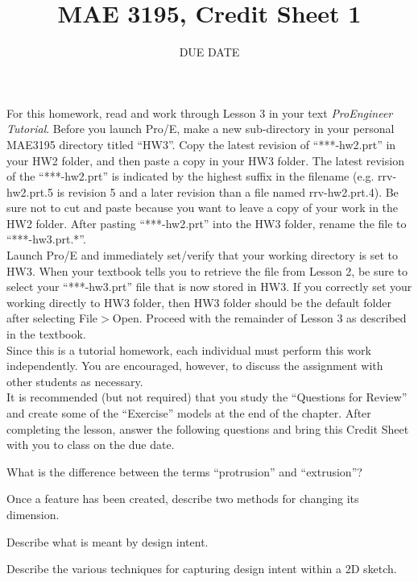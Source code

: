 \documentclass{homework}
\title{MAE 3195, Credit Sheet 1}
\author{DUE DATE}
\begin{document}
For this homework, read and work through Lesson 3 in your text \textit{ProEngineer Tutorial}. Before you launch Pro/E, make a new sub-directory in your personal MAE3195 directory titled ``HW3''. Copy the latest revision of ``***-hw2.prt'' in your HW2 folder, and then paste a copy in your HW3 folder. The latest revision of the ``***-hw2.prt'' is indicated by the highest suffix in the filename (e.g. rrv-hw2.prt.5 is revision 5 and a later revision than a file named rrv-hw2.prt.4). Be sure not to cut and paste because you want to leave a copy of your work in the HW2 folder. After pasting ``***-hw2.prt'' into the HW3 folder, rename the file to ``***-hw3.prt.*''.\\

Launch Pro/E and immediately set/verify that your working directory is set to HW3. When your textbook tells you to retrieve the file from Lesson 2, be sure to select your ``***-hw3.prt'' file that is now stored in HW3. If you correctly set your working directly to HW3 folder, then HW3 folder should be the default folder after selecting File$>$Open. Proceed with the remainder of Lesson 3 as described in the textbook.\\

Since this is a tutorial homework, each individual must perform this work independently. You are encouraged, however, to discuss the assignment with other students as necessary.\\

It is recommended (but not required) that you study the ``Questions for Review'' and create some of the ``Exercise'' models at the end of the chapter. After completing the lesson, answer the following questions and bring this Credit Sheet with you to class on the due date.

\problem{} What is the difference between the terms ``protrusion'' and ``extrusion''?
\solution

\problem{} Once a feature has been created, describe two methods for changing its dimension.
\solution

\problem{} Describe what is meant by design intent.
\solution

\problem{} Describe the various techniques for capturing design intent within a 2D sketch.
\solution

\problem{} 
\solutions
\end{document}
